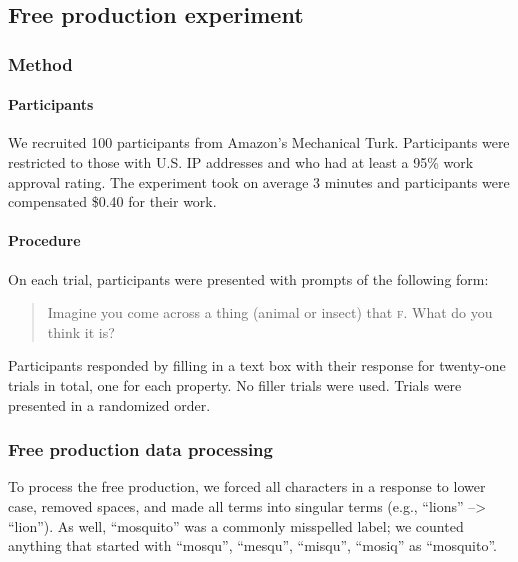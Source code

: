 \documentclass[english,,man,floatsintext]{apa6}
\let\oldparagraph\paragraph
\renewcommand{\paragraph}[1]{\oldparagraph{#1}\mbox{}}
\theoremstyle{definition}
\theoremstyle{definition}
\theoremstyle{definition}
\theoremstyle{remark}
\begin{document}
\hypertarget{free-production-experiment}{%
\subsection{Free production
experiment}\label{free-production-experiment}}

\hypertarget{method-8}{%
\subsubsection{Method}\label{method-8}}

\hypertarget{participants-8}{%
\paragraph{Participants}\label{participants-8}}

We recruited 100 participants from Amazon's Mechanical Turk.
Participants were restricted to those with U.S. IP addresses and who had
at least a 95\% work approval rating. The experiment took on average 3
minutes and participants were compensated \$0.40 for their work.

\hypertarget{procedure-5}{%
\paragraph{Procedure}\label{procedure-5}}

On each trial, participants were presented with prompts of the following
form:

\begin{quotation}
Imagine you come across a thing (animal or insect) that \textsc{f}.
What do you think it is?
\end{quotation}

Participants responded by filling in a text box with their response for
twenty-one trials in total, one for each property. No filler trials were
used. Trials were presented in a randomized order.

\hypertarget{free-production-data-processing}{%
\subsubsection{Free production data
processing}\label{free-production-data-processing}}

To process the free production, we forced all characters in a response
to lower case, removed spaces, and made all terms into singular terms
(e.g., \enquote{lions} --\textgreater{} \enquote{lion}). As well,
\enquote{mosquito} was a commonly misspelled label; we counted anything
that started with \enquote{mosqu}, \enquote{mesqu}, \enquote{misqu},
\enquote{mosiq} as \enquote{mosquito}.
\end{document}
